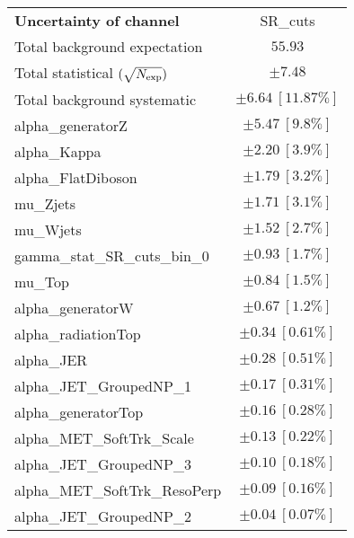 
\begin{table}
\begin{center}
\setlength{\tabcolsep}{0.0pc}
\begin{tabular*}{\textwidth}{@{\extracolsep{\fill}}lc}
\noalign{\smallskip}\hline\noalign{\smallskip}
{\bf Uncertainty of channel}                                    & SR\_cuts            \\
\noalign{\smallskip}\hline\noalign{\smallskip}
Total background expectation             &  $55.93$       \\
\noalign{\smallskip}\hline\noalign{\smallskip}
Total statistical $(\sqrt{N_{\rm exp}})$              & $\pm 7.48$       \\
Total background systematic               & $\pm 6.64\ [11.87\%] $             \\
\noalign{\smallskip}\hline\noalign{\smallskip}
\noalign{\smallskip}\hline\noalign{\smallskip}
alpha\_generatorZ         & $\pm 5.47\ [9.8\%] $       \\
alpha\_Kappa         & $\pm 2.20\ [3.9\%] $       \\
alpha\_FlatDiboson         & $\pm 1.79\ [3.2\%] $       \\
mu\_Zjets         & $\pm 1.71\ [3.1\%] $       \\
mu\_Wjets         & $\pm 1.52\ [2.7\%] $       \\
gamma\_stat\_SR\_cuts\_bin\_0         & $\pm 0.93\ [1.7\%] $       \\
mu\_Top         & $\pm 0.84\ [1.5\%] $       \\
alpha\_generatorW         & $\pm 0.67\ [1.2\%] $       \\
alpha\_radiationTop         & $\pm 0.34\ [0.61\%] $       \\
alpha\_JER         & $\pm 0.28\ [0.51\%] $       \\
alpha\_JET\_GroupedNP\_1         & $\pm 0.17\ [0.31\%] $       \\
alpha\_generatorTop         & $\pm 0.16\ [0.28\%] $       \\
alpha\_MET\_SoftTrk\_Scale         & $\pm 0.13\ [0.22\%] $       \\
alpha\_JET\_GroupedNP\_3         & $\pm 0.10\ [0.18\%] $       \\
alpha\_MET\_SoftTrk\_ResoPerp         & $\pm 0.09\ [0.16\%] $       \\
alpha\_JET\_GroupedNP\_2         & $\pm 0.04\ [0.07\%] $       \\

\end{tabular*}
\end{center}
\end{table}
